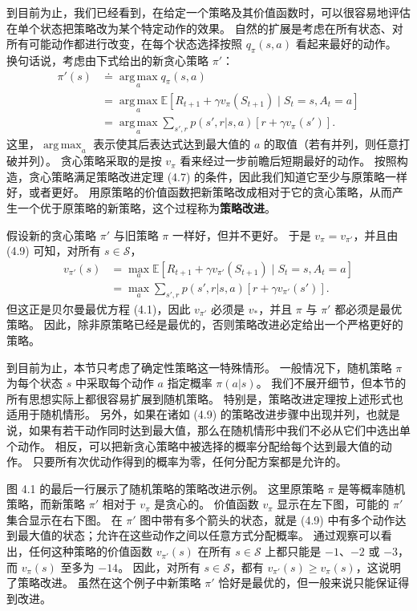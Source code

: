\documentclass[UTF8,12pt,a4paper,fontset=fandol]{ctexart}
\begin{document}
到目前为止，我们已经看到，在给定一个策略及其价值函数时，可以很容易地评估在单个状态把策略改为某个特定动作的效果。
自然的扩展是考虑在所有状态、对所有可能动作都进行改变，在每个状态选择按照 $q_\pi(s,a)$ 看起来最好的动作。
换句话说，考虑由下式给出的新贪心策略 $\pi'$：
\begin{equation}
\begin{aligned}
\pi'(s)
&\doteq \operatorname*{arg\,max}_a q_\pi(s,a)\\
&= \operatorname*{arg\,max}_a \mathbb{E}[R_{t+1}+\gamma v_\pi(S_{t+1})\mid S_t=s,A_t=a] \\
&= \operatorname*{arg\,max}_a \sum_{s',r}p(s',r|s,a)\left[r+\gamma v_\pi(s')\right].
\end{aligned}
\tag{4.9}
\end{equation}
这里，$\operatorname*{arg\,max}_a$ 表示使其后表达式达到最大值的 $a$ 的取值（若有并列，则任意打破并列）。
贪心策略采取的是按 $v_\pi$ 看来经过一步前瞻后短期最好的动作。
按照构造，贪心策略满足策略改进定理 (4.7) 的条件，因此我们知道它至少与原策略一样好，或者更好。
用原策略的价值函数把新策略改成相对于它的贪心策略，从而产生一个优于原策略的新策略，这个过程称为\textbf{策略改进}。

假设新的贪心策略 $\pi'$ 与旧策略 $\pi$ 一样好，但并不更好。
于是 $v_\pi=v_{\pi'}$，并且由 (4.9) 可知，对所有 $s\in\mathcal{S}$，
\[
\begin{aligned}
v_{\pi'}(s)
&= \max_a \mathbb{E}[R_{t+1}+\gamma v_{\pi'}(S_{t+1})\mid S_t=s,A_t=a]\\
&= \max_a \sum_{s',r}p(s',r|s,a)\left[r+\gamma v_{\pi'}(s')\right].
\end{aligned}
\]
但这正是贝尔曼最优方程 (4.1)，因此 $v_{\pi'}$ 必须是 $v_*$，并且 $\pi$ 与 $\pi'$ 都必须是最优策略。
因此，除非原策略已经是最优的，否则策略改进必定给出一个严格更好的策略。

到目前为止，本节只考虑了确定性策略这一特殊情形。
一般情况下，随机策略 $\pi$ 为每个状态 $s$ 中采取每个动作 $a$ 指定概率 $\pi(a|s)$。
我们不展开细节，但本节的所有思想实际上都很容易扩展到随机策略。
特别是，策略改进定理按上述形式也适用于随机情形。
另外，如果在诸如 (4.9) 的策略改进步骤中出现并列，也就是说，如果有若干动作同时达到最大值，那么在随机情形中我们不必从它们中选出单个动作。
相反，可以把新贪心策略中被选择的概率分配给每个达到最大值的动作。
只要所有次优动作得到的概率为零，任何分配方案都是允许的。

图 4.1 的最后一行展示了随机策略的策略改进示例。
这里原策略 $\pi$ 是等概率随机策略，而新策略 $\pi'$ 相对于 $v_\pi$ 是贪心的。
价值函数 $v_\pi$ 显示在左下图，可能的 $\pi'$ 集合显示在右下图。
在 $\pi'$ 图中带有多个箭头的状态，就是 (4.9) 中有多个动作达到最大值的状态；允许在这些动作之间以任意方式分配概率。
通过观察可以看出，任何这种策略的价值函数 $v_{\pi'}(s)$ 在所有 $s\in\mathcal{S}$ 上都只能是 $-1$、$-2$ 或 $-3$，而 $v_\pi(s)$ 至多为 $-14$。
因此，对所有 $s\in\mathcal{S}$，都有 $v_{\pi'}(s)\ge v_\pi(s)$，这说明了策略改进。
虽然在这个例子中新策略 $\pi'$ 恰好是最优的，但一般来说只能保证得到改进。
\end{document}
